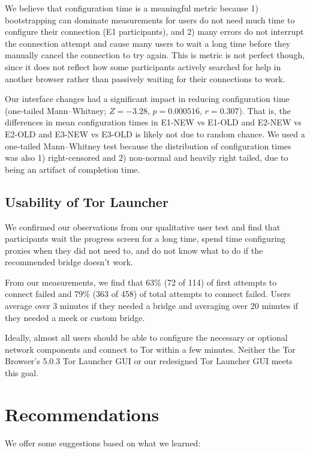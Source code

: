 \documentclass[USenglish,oneside,twocolumn]{article}
\begin{document}
We believe that configuration time is a meaningful metric because 1) bootstrapping can dominate measurements for users do not need much time to configure their connection (E1 participants), and 2) many errors do not interrupt the connection attempt and cause many users to wait a long time before they manually cancel the connection to try again. This is metric is not perfect though, since it does not reflect how some participants actively searched for help in another browser rather than passively waiting for their connections to work. 

Our interface changes had a significant impact in reducing configuration time (one-tailed Mann--Whitney; $Z = -3.28$, $p = 0.000516$, $r = 0.307$). That is, the differences in mean configuration times in E1-NEW vs E1-OLD and E2-NEW vs E2-OLD and E3-NEW vs E3-OLD is likely not due to random chance. We used a one-tailed Mann--Whitney test because the distribution of configuration times was also 1) right-censored and 2) non-normal and heavily right tailed, due to being an artifact of completion time. 

\subsection{Usability of Tor Launcher} 
We confirmed our observations from our qualitative user test and find that participants wait the progress screen for a long time, spend time configuring proxies when they did not need to, and do not know what to do if the recommended bridge doesn't work. 

From our measurements, we find that 63\% (72 of 114) of first attempts to connect failed and 79\% (363 of 458) of total attempts to connect failed. Users average over 3 minutes if they needed a bridge and averaging over 20 minutes if they needed a meek or custom bridge. 

Ideally, almost all users should be able to configure the necessary or optional network components and connect to Tor within a few minutes. Neither the Tor Browser's 5.0.3 Tor Launcher GUI or our redesigned Tor Launcher GUI meets this goal. 

\section{Recommendations}
\label{sec:recommendations}
We offer some suggestions based on what we learned: \\
\end{document}
